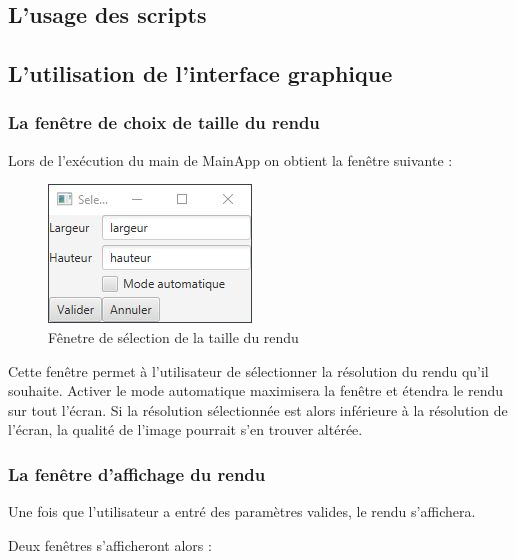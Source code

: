 \subsection{L'usage des scripts}

\subsection{L'utilisation de l'interface graphique}

\subsubsection{La fenêtre de choix de taille du rendu}

Lors de l'exécution du main de MainApp on obtient la fenêtre suivante :
\begin{figure}[h]
   \caption{Fênetre de sélection de la taille du rendu}
   \begin{center}
       \includegraphics{img/render.javafx/choiceWindow.jpg}
   \end{center}
\end{figure}

Cette fenêtre permet à l'utilisateur de sélectionner la résolution du rendu qu'il souhaite.
Activer le mode automatique maximisera la fenêtre et étendra le rendu sur tout l'écran. Si la résolution sélectionnée est alors inférieure à la résolution de l'écran, la qualité de l'image pourrait s'en trouver altérée.

\subsubsection{La fenêtre d'affichage du rendu}

Une fois que l'utilisateur a entré des paramètres valides, le rendu s'affichera.

Deux fenêtres s'afficheront alors :

